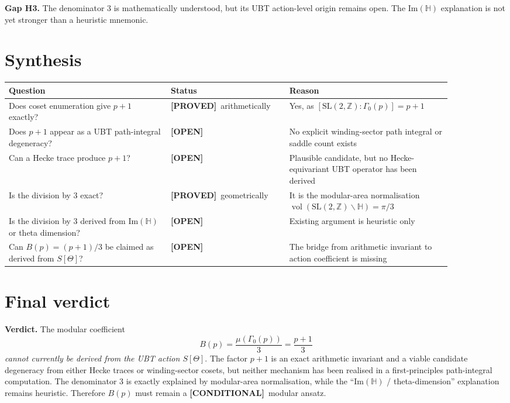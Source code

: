 \documentclass[12pt,a4paper]{article}
\theoremstyle{remark}
\newcommand{\PROVED}{\textcolor{green!50!black}{\textbf{[PROVED]}}}
\newcommand{\OPEN}{\textcolor{red!70!black}{\textbf{[OPEN]}}}
\newcommand{\COND}{\textcolor{blue!70!black}{\textbf{[CONDITIONAL]}}}
\begin{document}
\begin{gapbox}
\textbf{Gap H3.}  The denominator $3$ is mathematically understood, but its UBT
action-level origin remains open.  The $\mathrm{Im}(\mathbb{H})$ explanation is
not yet stronger than a heuristic mnemonic.
\end{gapbox}

\section{Synthesis}

\begin{center}
\begin{tabular}{@{}p{0.33\linewidth}p{0.22\linewidth}p{0.33\linewidth}@{}}
\toprule
Question & Status & Reason \\
\midrule
Does coset enumeration give $p+1$ exactly? & \PROVED\ arithmetically & Yes, as
$[\mathrm{SL}(2,\mathbb{Z}):\Gamma_0(p)]=p+1$ \\
\addlinespace
Does $p+1$ appear as a UBT path-integral degeneracy? & \OPEN & No explicit
winding-sector path integral or saddle count exists \\
\addlinespace
Can a Hecke trace produce $p+1$? & \OPEN & Plausible candidate, but no
Hecke-equivariant UBT operator has been derived \\
\addlinespace
Is the division by $3$ exact? & \PROVED\ geometrically & It is the modular-area
normalisation $\operatorname{vol}(\mathrm{SL}(2,\mathbb{Z})\backslash\mathbb{H})=\pi/3$ \\
\addlinespace
Is the division by $3$ derived from $\mathrm{Im}(\mathbb{H})$ or theta dimension? & \OPEN & Existing argument is heuristic only \\
\addlinespace
Can $B(p)=(p+1)/3$ be claimed as derived from $S[\Theta]$? & \textbf{\OPEN} &
The bridge from arithmetic invariant to action coefficient is missing \\
\bottomrule
\end{tabular}
\end{center}

\section{Final verdict}

\begin{resultbox}
\textbf{Verdict.}  The modular coefficient
\[
  B(p)=\frac{\mu(\Gamma_0(p))}{3}=\frac{p+1}{3}
\]
\emph{cannot currently be derived from the UBT action $S[\Theta]$}.  The factor
$p+1$ is an exact arithmetic invariant and a viable candidate degeneracy from
either Hecke traces or winding-sector cosets, but neither mechanism has been
realised in a first-principles path-integral computation.  The denominator $3$
is exactly explained by modular-area normalisation, while the
``$\mathrm{Im}(\mathbb{H})$ / theta-dimension'' explanation remains heuristic.
Therefore $B(p)$ must remain a \COND\ modular ansatz.
\end{resultbox}
\end{document}
